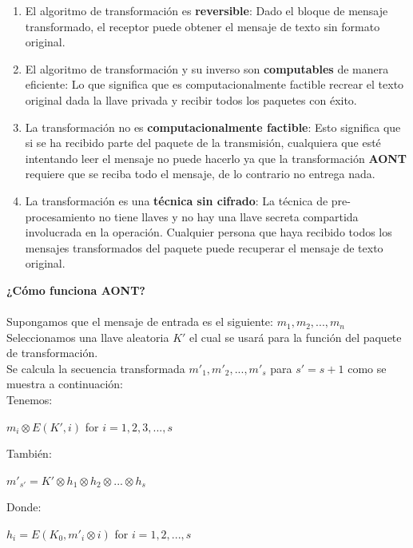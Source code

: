 \documentclass[12pt, a4paper, titlepage]{article}
\begin{document}
        \begin{enumerate}
            \item El algoritmo de transformación es \textbf{reversible}: Dado el bloque de mensaje transformado, el receptor puede obtener el mensaje de texto sin formato original.
            \item El algoritmo de transformación y su inverso son \textbf{computables} de manera eficiente: Lo que significa que es computacionalmente factible recrear el texto original dada la llave privada y recibir todos los paquetes con éxito.
            \item La transformación no es \textbf{computacionalmente factible}: Esto significa que si se ha recibido parte del paquete de la transmisión, cualquiera que esté intentando leer el mensaje no puede hacerlo ya que la transformación \textbf{AONT} requiere que se reciba todo el mensaje, de lo contrario no entrega nada.
            \item La transformación es una \textbf{técnica sin cifrado}: La técnica de pre-procesamiento no tiene llaves y no hay una llave secreta compartida involucrada en la operación. Cualquier persona que haya recibido todos los mensajes transformados del paquete puede recuperar el mensaje de texto original.
        \end{enumerate}
        
        \textbf{¿Cómo funciona AONT?}
        
        \paragraph{}
        Supongamos que el mensaje de entrada es el siguiente: $m_{1},m_{2},...,m_{n}$
        Seleccionamos una llave aleatoria $K'$ el cual se usará para la función del paquete de transformación.\\
        Se calcula la secuencia transformada ${m'}_{1}, {m'}_{2},...,{m'}_{s}$ para ${s'}=s+1$ como se muestra a continuación:\\
        Tenemos:
        \begin{center}
            $m_{i} \otimes E(K',i)$ for  $i=1,2,3,...,s$
        \end{center}
        También:
        \begin{center}
            $m'_{s'}=K' \otimes h_{1} \otimes h_{2} \otimes ... \otimes h_{s}$
        \end{center}
        
        Donde:
        \begin{center}
            $h_i=E(K_0,m'_i \otimes i)$ for $i=1,2,...,s$
        \end{center}
        
\end{document}
